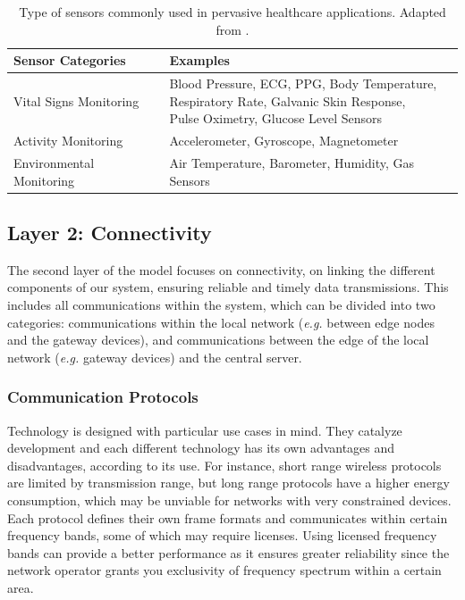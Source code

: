 \renewcommand{\arraystretch}{2}
\begin{table}[H]
    \centering
    \begin{tabular}{l|l}
        \textbf{Sensor Categories} & \textbf{Examples} \\ 
        \hline
        Vital Signs Monitoring & \makecell{Blood Pressure, \acs{ECG}, \acs{PPG}, Body Temperature, \\ Respiratory Rate, Galvanic Skin Response, \\ Pulse Oximetry, Glucose Level Sensors} \\
        Activity Monitoring & Accelerometer, Gyroscope, Magnetometer\\
        Environmental Monitoring & Air Temperature, Barometer, Humidity, Gas Sensors \\
    \end{tabular}
    \caption[Type of sensors commonly used in pervasive healthcare applications.]{Type of sensors commonly used in pervasive healthcare applications. Adapted from \cite{MinhDang2019}.}
    \label{tab:layer1-sensors} 
\end{table}
\renewcommand{\arraystretch}{1}

\subsection{Layer 2: Connectivity}
\label{sec:iot-model-layer2}

The second layer of the model focuses on connectivity, on linking the different components of our system, ensuring reliable and timely data transmissions. This includes all communications within the system, which can be divided into two categories: communications within the local network (\textit{e.g.} between edge nodes and the gateway devices), and communications between the edge of the local network (\textit{e.g.} gateway devices) and the central server. \bigskip

\subsubsection{Communication Protocols}

Technology is designed with particular use cases in mind. They catalyze development and each different technology has its own advantages and disadvantages, according to its use. For instance, short range wireless protocols are limited by transmission range, but long range protocols have a higher energy consumption, which may be unviable for networks with very constrained devices. Each protocol defines their own frame formats and communicates within certain frequency bands, some of which may require licenses. Using licensed frequency bands can provide a better performance as it ensures greater reliability since the network operator grants you exclusivity of frequency spectrum within a certain area. \bigskip

